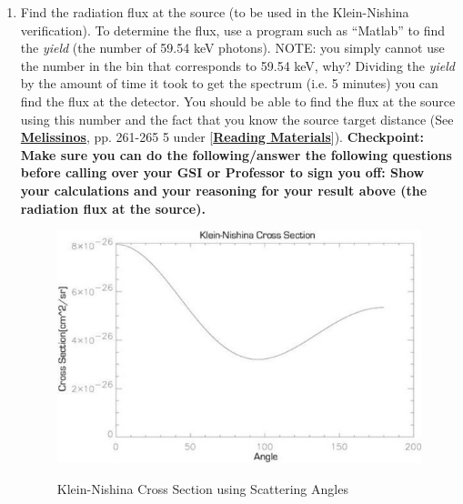 \documentclass{../lab}
\begin{document}
\begin{enumerate}
    \item Find the radiation flux at the source (to be used in the Klein-Nishina verification). To determine the flux, use a program such as ``Matlab'' to find the \emph{yield} (the number of 59.54 keV photons). NOTE: you simply cannot use the number in the bin that corresponds to 59.54 keV, why? Dividing the \emph{yield} by the amount of time it took to get the spectrum (i.e. 5 minutes) you can find the flux at the detector. You should be able to find the flux at the source using this number and the fact that you know the source target distance (See \href{http://physics111.lib.berkeley.edu/Physics111/Reprints/COM/Melissinos\%201966\%20pg\%20252-265\%20and\%20369-384.pdf}{\textbf{Melissinos}}, pp. 261-265 5 under [\href{http://physics111.lib.berkeley.edu/Physics111/Reprints/COM/COM\_index.html}{\textbf{Reading Materials}}]). \textbf{Checkpoint: Make sure you can do the following/answer the following questions before calling over your GSI or Professor to sign you off:
	Show your calculations and your reasoning for your result above (the radiation flux at the source).}

    \begin{figure}[h]
        \centering
        \href{http://experimentationlab.berkeley.edu/sites/default/files/images/550px-COMimage013.jpg}{\includegraphics[width=0.7\linewidth]{images/550px-COMimage013.jpg}}
        \caption{Klein-Nishina Cross Section using Scattering Angles}
        \label{fig:550px-COMimage013}
    \end{figure}


\end{enumerate}
\end{document}
